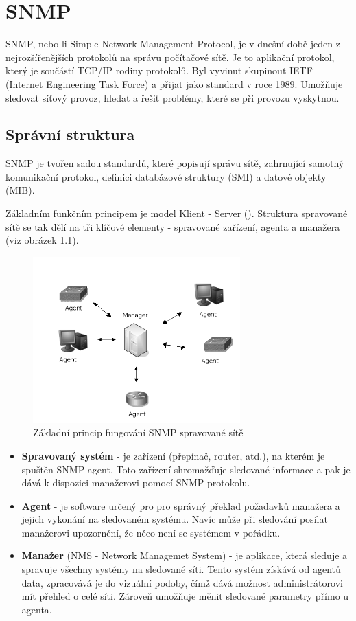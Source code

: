 \chapter{SNMP}
\label{kap_snmp}
SNMP, nebo-li Simple Network Management Protocol, je v dnešní době jeden z nejrozšířenějších protokolů na správu počítačové sítě. Je to aplikační protokol, který je součástí TCP/IP rodiny protokolů. 
Byl vyvinut skupinout IETF (Internet Engineering Task Force) a přijat jako standard v roce 1989. Umožňuje sledovat síťový provoz, hledat a řešit problémy, které se při provozu vyskytnou. 

\section{Správní struktura}
SNMP je tvořen sadou standardů, které popisují správu sítě, zahrnující samotný komunikační protokol, definici databázové struktury (SMI) a datové objekty (MIB).

Základním funkčním principem je model Klient - Server (\cite{cisco_snmp}). Struktura spravované sítě se tak dělí na tři klíčové elementy - spravované zařízení, agenta a manažera (viz obrázek \ref{obr_snmp1}).

\begin{figure}[htp]
	\begin{center}
		\includegraphics[width=8cm]{obrazky/02_snmp_principle.png}
		\caption{Základní princip fungování SNMP spravované sítě}
		\label{obr_snmp1}
	\end{center}
\end{figure}

\begin{itemize}
	\item \textbf{Spravovaný systém} - je zařízení (přepínač, router, atd.), na kterém je spuštěn SNMP agent. Toto zařízení shromažďuje sledované informace a pak je
	dává k dispozici manažerovi pomocí SNMP protokolu.
	\item \textbf{Agent} - je software určený pro pro správný překlad požadavků manažera a jejich vykonání na sledovaném systému. Navíc může při sledování posílat manažerovi 
	upozornění, že něco není se systémem v pořádku.
	\item \textbf{Manažer} (NMS - Network Managemet System) - je aplikace, která sleduje a spravuje všechny systémy na sledované síti. Tento systém získává od agentů data, zpracovává je do vizuální podoby, 
	čímž dává možnost administrátorovi mít přehled o celé síti. Zároveň umožňuje měnit sledované parametry přímo u agenta.
\end{itemize}

